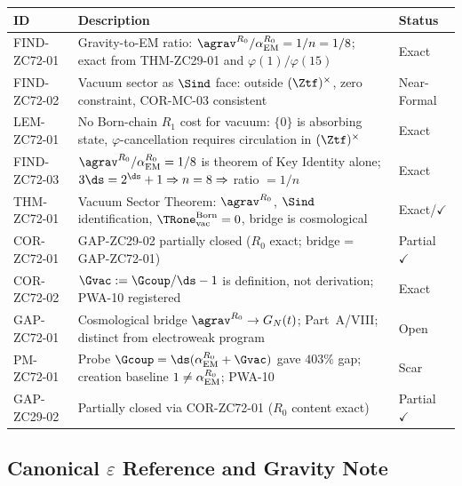 \documentclass[12pt, a4paper]{article}
\renewcommand{\aEM}{\alpha_{\rm EM}}
\begin{document}
\begin{formalbox}[title={Atomic Registry --- ZC72}]
\begin{center}
\renewcommand{\arraystretch}{1.3}
\small
\begin{tabular}{lp{8.0cm}l}
\toprule
ID & Description & Status \\
\midrule
FIND-ZC72-01
  & Gravity-to-EM ratio: $\agrav^{R_0}/\aEM^{R_0} = 1/n = 1/8$;
    exact from THM-ZC29-01 and $\varphi(1)/\varphi(15)$
  & Exact \\[3pt]
FIND-ZC72-02
  & Vacuum sector as $\Sind$ face: outside $(\Ztf)^\times$,
    zero constraint, COR-MC-03 consistent
  & Near-Formal \\[3pt]
LEM-ZC72-01
  & No Born-chain $R_1$ cost for vacuum: $\{0\}$ is absorbing state,
    $\varphi$-cancellation requires circulation in $(\Ztf)^\times$
  & Exact \\[3pt]
FIND-ZC72-03
  & $\agrav^{R_0}/\aEM^{R_0} = 1/8$ is theorem of Key Identity alone;
    $3\ds=2^{\ds}+1 \Rightarrow n=8 \Rightarrow $ ratio $= 1/n$
  & Exact \\[3pt]
THM-ZC72-01
  & Vacuum Sector Theorem: $\agrav^{R_0}$, $\Sind$ identification,
    $\TRone_{\rm vac}^{\rm Born}=0$, bridge is cosmological
  & Exact/$\checkmark$ \\[3pt]
COR-ZC72-01
  & GAP-ZC29-02 partially closed ($R_0$ exact; bridge = GAP-ZC72-01)
  & Partial $\checkmark$ \\[3pt]
COR-ZC72-02
  & $\Gvac := \Gcoup/\ds - 1$ is definition, not derivation;
    PWA-10 registered
  & Exact \\[3pt]
GAP-ZC72-01
  & Cosmological bridge $\agrav^{R_0} \to G_N(t)$; Part~A/VIII;
    distinct from electroweak program
  & Open \\[3pt]
PM-ZC72-01
  & Probe $\Gcoup = \ds(\aEM^{R_0}+\Gvac)$ gave $403\%$ gap;
    creation baseline $1 \neq \aEM^{R_0}$; PWA-10
  & Scar \\
\midrule
GAP-ZC29-02
  & Partially closed via COR-ZC72-01 ($R_0$ content exact)
  & Partial $\checkmark$ \\
\bottomrule
\end{tabular}
\end{center}
\end{formalbox}


\subsection{Canonical $\varepsilon$ Reference and Gravity Note}
\label{sec:eps-table}
\end{document}
